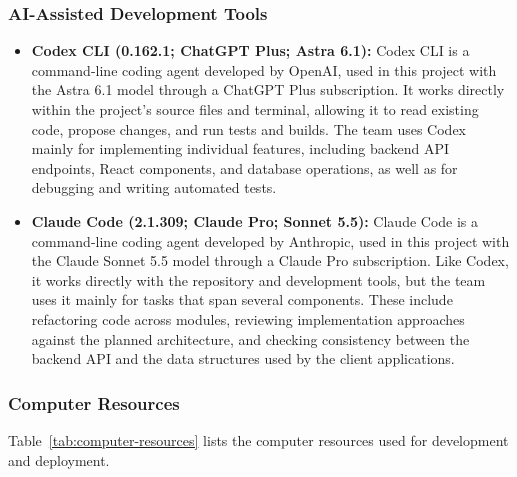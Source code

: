 \documentclass[conference]{IEEEtran}
\begin{document}
\subsubsection{AI-Assisted Development Tools}
\begin{itemize}
    \item \textbf{Codex CLI (0.162.1; ChatGPT Plus; Astra 6.1):} Codex CLI is a command-line coding agent developed by OpenAI, used in this project with the Astra 6.1 model through a ChatGPT Plus subscription. It works directly within the project's source files and terminal, allowing it to read existing code, propose changes, and run tests and builds. The team uses Codex mainly for implementing individual features, including backend API endpoints, React components, and database operations, as well as for debugging and writing automated tests.
    \item \textbf{Claude Code (2.1.309; Claude Pro; Sonnet 5.5):} Claude Code is a command-line coding agent developed by Anthropic, used in this project with the Claude Sonnet 5.5 model through a Claude Pro subscription. Like Codex, it works directly with the repository and development tools, but the team uses it mainly for tasks that span several components. These include refactoring code across modules, reviewing implementation approaches against the planned architecture, and checking consistency between the backend API and the data structures used by the client applications.
\end{itemize}

\subsubsection{Computer Resources}
Table~\ref{tab:computer-resources} lists the computer resources used for development and deployment.
\end{document}
